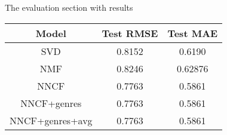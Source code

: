 The evaluation section with results

\begin{figure}[h!]
    \hfill
\end{figure}

\begin{center}
    \begin{tabular}{||c c c||} 
    \hline
    Model & Test RMSE & Test MAE \\ [0.5ex] 
    \hline
    SVD & 0.8152 & 0.6190 \\ 
    \hline
    NMF & 0.8246 & 0.62876 \\
    \hline
    NNCF & 0.7763 & 0.5861 \\
    \hline 
    NNCF+genres & 0.7763 & 0.5861 \\
    \hline
    NNCF+genres+avg & 0.7763 & 0.5861 \\[1ex]
    \hline
   \end{tabular}
\label{comparison}
\end{center}